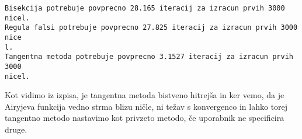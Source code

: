 \documentclass[12pt,a4paper]{article}
\begin{document}
\begin{lstlisting}
Bisekcija potrebuje povprecno 28.165 iteracij za izracun prvih 3000 nicel.
Regula falsi potrebuje povprecno 27.825 iteracij za izracun prvih 3000 nice
l.
Tangentna metoda potrebuje povprecno 3.1527 iteracij za izracun prvih 3000 
nicel.
\end{lstlisting}


Kot vidimo iz izpisa, je tangentna metoda bistveno hitrejša in ker vemo, da je Airyjeva funkcija vedno strma blizu ničle, ni težav s konvergenco in lahko torej tangentno metodo nastavimo kot privzeto metodo, če uporabnik ne specificira druge.


\begin{lstlisting}

\end{lstlisting}
\end{document}

